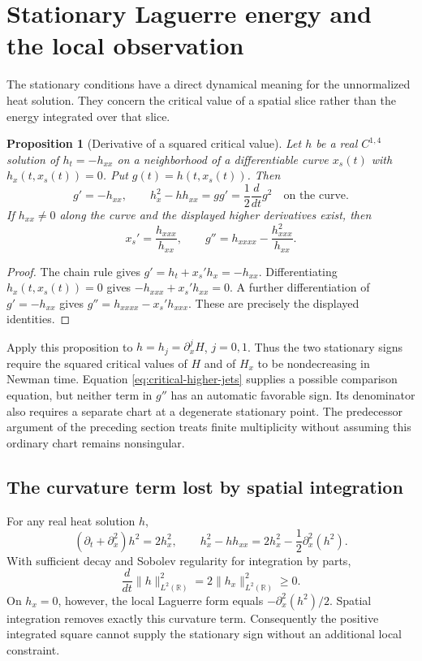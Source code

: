 \documentclass[11pt]{article}
\numberwithin{equation}{section}
\newtheorem{proposition}[theorem]{Proposition}
\theoremstyle{definition}
\theoremstyle{remark}
\begin{document}
\section{Stationary Laguerre energy and the local observation}\label{sec:critical-energy}
The stationary conditions have a direct dynamical meaning for the
unnormalized heat solution. They concern the critical value of a spatial
slice rather than the energy integrated over that slice.

\begin{proposition}[Derivative of a squared critical value]\label{prop:critical-energy}
Let $h$ be a real $C^{1,4}$ solution of $h_t=-h_{xx}$ on a neighborhood
of a differentiable curve $x_s(t)$ with $h_x(t,x_s(t))=0$. Put
$g(t)=h(t,x_s(t))$. Then
\begin{equation}\label{eq:critical-energy}
 g'=-h_{xx},\qquad
 h_x^2-hh_{xx}=gg'=\frac12\frac{d}{dt}g^2
 \quad\text{on the curve}.
\end{equation}
If $h_{xx}\ne0$ along the curve and the displayed higher derivatives
exist, then
\begin{equation}\label{eq:critical-higher-jets}
 x_s'=\frac{h_{xxx}}{h_{xx}},\qquad
 g''=h_{xxxx}-\frac{h_{xxx}^2}{h_{xx}}.
\end{equation}
\end{proposition}
\begin{proof}
The chain rule gives $g'=h_t+x_s'h_x=-h_{xx}$. Differentiating
$h_x(t,x_s(t))=0$ gives $-h_{xxx}+x_s'h_{xx}=0$.
A further differentiation of $g'=-h_{xx}$ gives
$g''=h_{xxxx}-x_s'h_{xxx}$. These are precisely the displayed identities.
\end{proof}
Apply this proposition to $h=h_j=\partial_x^jH$, $j=0,1$.
Thus the two stationary signs require the squared critical values of
$H$ and of $H_x$ to be nondecreasing in Newman time. Equation
\eqref{eq:critical-higher-jets} supplies a possible comparison equation,
but neither term in $g''$ has an automatic favorable sign. Its denominator
also requires a separate chart at a degenerate stationary point. The
predecessor argument of the preceding section treats finite multiplicity
without assuming this ordinary chart remains nonsingular.

\subsection{The curvature term lost by spatial integration}
For any real heat solution $h$,
\begin{equation}\label{eq:local-square-defect}
 (\partial_t+\partial_x^2)h^2=2h_x^2,\qquad
 h_x^2-hh_{xx}=2h_x^2-\frac12\partial_x^2(h^2).
\end{equation}
With sufficient decay and Sobolev regularity for integration by parts,
\begin{equation}\label{eq:integrated-energy}
 \frac{d}{dt}\|h\|_{L^2(\mathbb R)}^2
 =2\|h_x\|_{L^2(\mathbb R)}^2\ge0.
\end{equation}
On $h_x=0$, however, the local Laguerre form equals
$-\partial_x^2(h^2)/2$. Spatial integration removes exactly this curvature
term. Consequently the positive integrated square cannot supply the
stationary sign without an additional local constraint.
\end{document}
